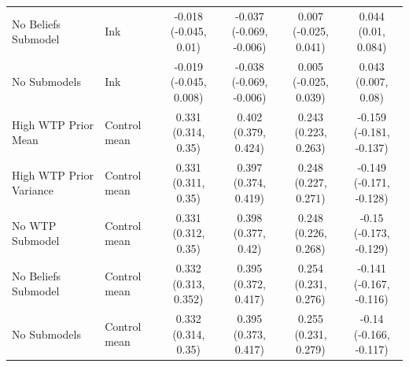 {\begin{tabular}[t]{llcccc}
No Beliefs Submodel & Ink & \makecell[c]{-0.018\\(-0.045, 0.01)} & \makecell[c]{-0.037\\(-0.069, -0.006)} & \makecell[c]{0.007\\(-0.025, 0.041)} & \makecell[c]{0.044\\(0.01, 0.084)}\\
No Submodels & Ink & \makecell[c]{-0.019\\(-0.045, 0.008)} & \makecell[c]{-0.038\\(-0.069, -0.006)} & \makecell[c]{0.005\\(-0.025, 0.039)} & \makecell[c]{0.043\\(0.007, 0.08)}\\
\midrule
High WTP Prior Mean & Control mean & \makecell[c]{0.331\\(0.314, 0.35)} & \makecell[c]{0.402\\(0.379, 0.424)} & \makecell[c]{0.243\\(0.223, 0.263)} & \makecell[c]{-0.159\\(-0.181, -0.137)}\\
High WTP Prior Variance & Control mean & \makecell[c]{0.331\\(0.311, 0.35)} & \makecell[c]{0.397\\(0.374, 0.419)} & \makecell[c]{0.248\\(0.227, 0.271)} & \makecell[c]{-0.149\\(-0.171, -0.128)}\\
No WTP Submodel & Control mean & \makecell[c]{0.331\\(0.312, 0.35)} & \makecell[c]{0.398\\(0.377, 0.42)} & \makecell[c]{0.248\\(0.226, 0.268)} & \makecell[c]{-0.15\\(-0.173, -0.129)}\\
No Beliefs Submodel & Control mean & \makecell[c]{0.332\\(0.313, 0.352)} & \makecell[c]{0.395\\(0.372, 0.417)} & \makecell[c]{0.254\\(0.231, 0.276)} & \makecell[c]{-0.141\\(-0.167, -0.116)}\\
No Submodels & Control mean & \makecell[c]{0.332\\(0.314, 0.35)} & \makecell[c]{0.395\\(0.373, 0.417)} & \makecell[c]{0.255\\(0.231, 0.279)} & \makecell[c]{-0.14\\(-0.166, -0.117)}\\

\end{tabular}}
